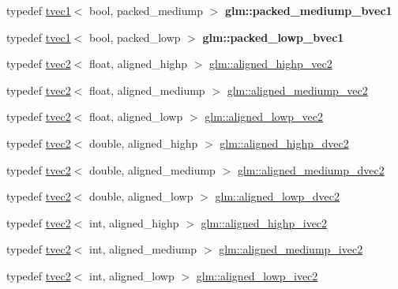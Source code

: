 \begin{DoxyCompactItemize}
typedef \hyperlink{structglm_1_1tvec1}{tvec1}$<$ bool, packed\+\_\+mediump $>$ {\bfseries glm\+::packed\+\_\+mediump\+\_\+bvec1}
\item 
\mbox{\label{group__gtc__type__aligned_ga4b803db802aa82cc46d17120e786de1d}} 
typedef \hyperlink{structglm_1_1tvec1}{tvec1}$<$ bool, packed\+\_\+lowp $>$ {\bfseries glm\+::packed\+\_\+lowp\+\_\+bvec1}
\item 
typedef \hyperlink{structglm_1_1tvec2}{tvec2}$<$ float, aligned\+\_\+highp $>$ \hyperlink{group__gtc__type__aligned_ga5873b18cca2602c92bb077e663e29bbd}{glm\+::aligned\+\_\+highp\+\_\+vec2}
\item 
typedef \hyperlink{structglm_1_1tvec2}{tvec2}$<$ float, aligned\+\_\+mediump $>$ \hyperlink{group__gtc__type__aligned_ga4bbaec6ecf4e72dfdb2ad83b3b8c49b8}{glm\+::aligned\+\_\+mediump\+\_\+vec2}
\item 
typedef \hyperlink{structglm_1_1tvec2}{tvec2}$<$ float, aligned\+\_\+lowp $>$ \hyperlink{group__gtc__type__aligned_gab09a9786d58f065dafde28b725cc5370}{glm\+::aligned\+\_\+lowp\+\_\+vec2}
\item 
typedef \hyperlink{structglm_1_1tvec2}{tvec2}$<$ double, aligned\+\_\+highp $>$ \hyperlink{group__gtc__type__aligned_gaaaaceecde7bb178eebc873836c7e6009}{glm\+::aligned\+\_\+highp\+\_\+dvec2}
\item 
typedef \hyperlink{structglm_1_1tvec2}{tvec2}$<$ double, aligned\+\_\+mediump $>$ \hyperlink{group__gtc__type__aligned_ga7b8277f7fd1d4c9d824685d12080db4f}{glm\+::aligned\+\_\+mediump\+\_\+dvec2}
\item 
typedef \hyperlink{structglm_1_1tvec2}{tvec2}$<$ double, aligned\+\_\+lowp $>$ \hyperlink{group__gtc__type__aligned_ga34c204b5e816428a4ad5b0489fe8aa48}{glm\+::aligned\+\_\+lowp\+\_\+dvec2}
\item 
typedef \hyperlink{structglm_1_1tvec2}{tvec2}$<$ int, aligned\+\_\+highp $>$ \hyperlink{group__gtc__type__aligned_ga9fe485a34b77916c1817ab4ba2ad3b20}{glm\+::aligned\+\_\+highp\+\_\+ivec2}
\item 
typedef \hyperlink{structglm_1_1tvec2}{tvec2}$<$ int, aligned\+\_\+mediump $>$ \hyperlink{group__gtc__type__aligned_ga7c713a802c9a63481c0bab775e16d003}{glm\+::aligned\+\_\+mediump\+\_\+ivec2}
\item 
typedef \hyperlink{structglm_1_1tvec2}{tvec2}$<$ int, aligned\+\_\+lowp $>$ \hyperlink{group__gtc__type__aligned_gaa68001df1954981214e828384e776d8e}{glm\+::aligned\+\_\+lowp\+\_\+ivec2}
\item 

\end{DoxyCompactItemize}
